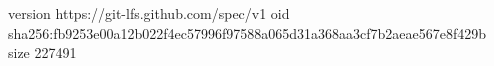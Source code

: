 version https://git-lfs.github.com/spec/v1
oid sha256:fb9253e00a12b022f4ec57996f97588a065d31a368aa3cf7b2aeae567e8f429b
size 227491
